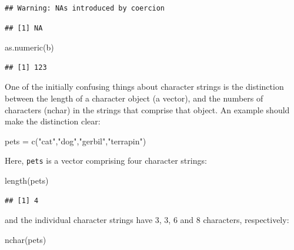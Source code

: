 \documentclass[
]{book}
\newenvironment{Shaded}{\begin{snugshade}}{\end{snugshade}}
\newcommand{\FunctionTok}[1]{\textcolor[rgb]{0.00,0.00,0.00}{#1}}
\newcommand{\NormalTok}[1]{#1}
\newcommand{\OtherTok}[1]{\textcolor[rgb]{0.56,0.35,0.01}{#1}}
\newcommand{\StringTok}[1]{\textcolor[rgb]{0.31,0.60,0.02}{#1}}
\theoremstyle{definition}
\theoremstyle{definition}
\theoremstyle{definition}
\theoremstyle{definition}
\theoremstyle{remark}
\begin{document}
\begin{verbatim}
## Warning: NAs introduced by coercion
\end{verbatim}

\begin{verbatim}
## [1] NA
\end{verbatim}

\begin{Shaded}
\begin{Highlighting}[]
\FunctionTok{as.numeric}\NormalTok{(b)}
\end{Highlighting}
\end{Shaded}

\begin{verbatim}
## [1] 123
\end{verbatim}

One of the initially confusing things about character strings is the distinction between the length of a character object (a vector), and the numbers of characters (nchar) in the strings that comprise that object.
An example should make the distinction clear:

\begin{Shaded}
\begin{Highlighting}[]
\NormalTok{pets }\OtherTok{=} \FunctionTok{c}\NormalTok{(}\StringTok{"cat"}\NormalTok{,}\StringTok{"dog"}\NormalTok{,}\StringTok{"gerbil"}\NormalTok{,}\StringTok{"terrapin"}\NormalTok{)}
\end{Highlighting}
\end{Shaded}

Here, \texttt{pets} is a vector comprising four character strings:

\begin{Shaded}
\begin{Highlighting}[]
\FunctionTok{length}\NormalTok{(pets)}
\end{Highlighting}
\end{Shaded}

\begin{verbatim}
## [1] 4
\end{verbatim}

and the individual character strings have 3, 3, 6 and 8 characters, respectively:

\begin{Shaded}
\begin{Highlighting}[]
\FunctionTok{nchar}\NormalTok{(pets)}
\end{Highlighting}
\end{Shaded}
\end{document}
